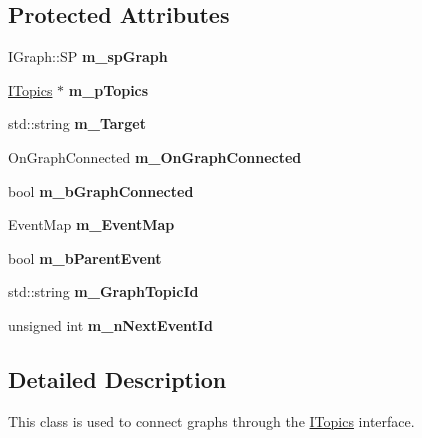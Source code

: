 \subsection*{Protected Attributes}
\begin{DoxyCompactItemize}
\item 
\mbox{\label{class_graph_connector_a552efdebf8eb045f2ed8fde903e82c6f}} 
I\+Graph\+::\+SP {\bfseries m\+\_\+sp\+Graph}
\item 
\mbox{\label{class_graph_connector_a7198c5a4f97b4edb55678c05ee2fe376}} 
\hyperlink{class_i_topics}{I\+Topics} $\ast$ {\bfseries m\+\_\+p\+Topics}
\item 
\mbox{\label{class_graph_connector_a6f3df4552a46d2b9bc81740ea6635254}} 
std\+::string {\bfseries m\+\_\+\+Target}
\item 
\mbox{\label{class_graph_connector_ae66b7f911c6a3350a639bbf17ef3503a}} 
On\+Graph\+Connected {\bfseries m\+\_\+\+On\+Graph\+Connected}
\item 
\mbox{\label{class_graph_connector_a58850f715ed348f2fc464eec638b0c5a}} 
bool {\bfseries m\+\_\+b\+Graph\+Connected}
\item 
\mbox{\label{class_graph_connector_a4ed9486ea3bf380e09e0564c31b95615}} 
Event\+Map {\bfseries m\+\_\+\+Event\+Map}
\item 
\mbox{\label{class_graph_connector_ac5bb4302e2c30eedc427a63cd82f2d04}} 
bool {\bfseries m\+\_\+b\+Parent\+Event}
\item 
\mbox{\label{class_graph_connector_ac4a2df1fc9ae3ff879e39c8e1f46ed07}} 
std\+::string {\bfseries m\+\_\+\+Graph\+Topic\+Id}
\item 
\mbox{\label{class_graph_connector_a33b22c6af1b8a9cd60974cdcdd0ae44b}} 
unsigned int {\bfseries m\+\_\+n\+Next\+Event\+Id}
\end{DoxyCompactItemize}


\subsection{Detailed Description}
This class is used to connect graphs through the \hyperlink{class_i_topics}{I\+Topics} interface. 

